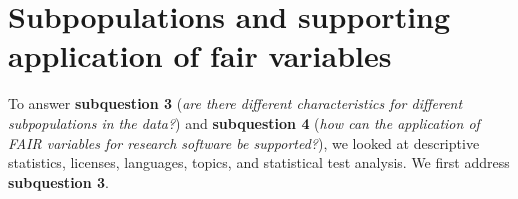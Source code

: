 
\section{Subpopulations and supporting application of \acrshort{fair} variables}
\label{sec:disc:sq3_sq4}

To answer \textbf{subquestion 3} (\textit{are there different characteristics for different subpopulations in the data?}) and \textbf{subquestion 4} (\textit{how can the application of FAIR variables for research software be supported?}), we looked at descriptive statistics, licenses, languages, topics, and statistical test analysis. We first address \textbf{subquestion 3}. 

